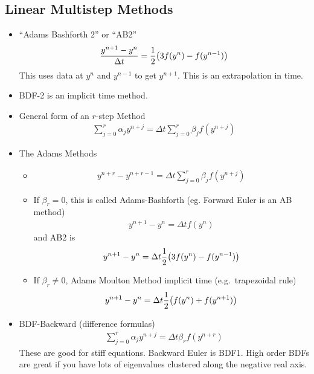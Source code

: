 \documentclass{article}
\newcommand{\Dt}{\Delta t}
\begin{document}
        \subsection{Linear Multistep Methods}
            \begin{itemize}
                \item ``Adams Bashforth 2'' or ``AB2''
                \begin{align*}
                    \frac{y^{n+1} - y^n}{\Dt} = \frac{1}{2}\qty(3f(y^n) - f(y^{n-1}))
                \end{align*}
                This uses data at $y^n$ and $y^{n-1}$ to get $y^{n+1}$.  This is an extrapolation in time.
                \item BDF-2 is an implicit time method.
                \item General form of an $r$-step Method
                \begin{align*}
                    \sum_{j=0}^r\alpha_jy^{n+j} = \Dt\sum_{j=0}^r\beta_jf(y^{n+j})
                \end{align*}
                \item The Adams Methods
                \begin{itemize}
                    \item \begin{align*}
                        y^{n+r} - y^{n+r-1} = \Dt\sum_{j=0}^r\beta_jf(y^{n+j})
                    \end{align*}
                    \item If $\beta_r = 0$, this is called Adams-Bashforth (eg. Forward Euler is an AB method)
                    \begin{align*}
                        y^{n+1} - y^n = \Dt f(y^n)
                    \end{align*}
                    and AB2 is
                    \begin{align*}
                        y^{n+1} - y^n = \Dt\frac{1}{2}\qty(3f(y^n) - f(y^{n-1}))
                    \end{align*}
                    \item If $\beta_r \neq 0$, Adams Moulton Method implicit time (e.g.~trapezoidal rule)
                    \begin{align*}
                        y^{n+1} - y^n = \Dt\frac{1}{2}\qty(f(y^n) + f(y^{n+1}))
                    \end{align*}
                \end{itemize}
                \item BDF-Backward (difference formulas)
                \begin{align*}
                    \sum_{j=0}^r\alpha_jy^{n+j} = \Dt\beta_rf(y^{n+r})
                \end{align*}
                These are good for stiff equations.  Backward Euler is BDF1.  High order BDFs are great if you have lots of eigenvalues clustered along the negative real axis.
            \end{itemize}
\end{document}
